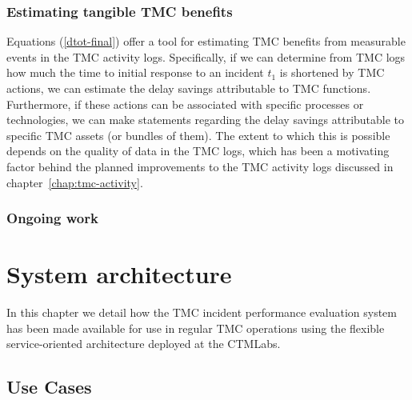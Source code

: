 \documentclass[12pt]{report}
\newcounter{time}
\begin{document}
\subsection{Estimating tangible TMC benefits}
\label{sec:est-benefits}

Equations (\ref{dtot-final}) offer a tool for estimating \ac{TMC} benefits
from measurable events in the \ac{TMC} activity logs.  Specifically, if we
can determine from \ac{TMC} logs how much the time to initial response to
an incident $t_1$ is shortened by \ac{TMC} actions, we can estimate the
delay savings attributable to \ac{TMC} functions.  Furthermore, if these
actions can be associated with specific processes or technologies, we
can make statements regarding the delay savings attributable to
specific \ac{TMC} assets (or bundles of them). The extent to which this is
possible depends on the quality of data in the \ac{TMC} logs, which has
been a motivating factor behind the planned improvements to the \ac{TMC}
activity logs discussed in chapter~\ref{chap:tmc-activity}.


\subsection{Ongoing work}
\label{sec:ongoing-work-tmc-impact}




\chapter{System architecture}
\label{sec:system-architecture}


In this chapter we detail how the \ac{TMC} incident performance evaluation
system has been made available for use in regular \ac{TMC} operations using the
flexible service-oriented architecture deployed at the \ac{CTMLabs}.

\section{Use Cases}
\label{sec:use-cases}
\end{document}
